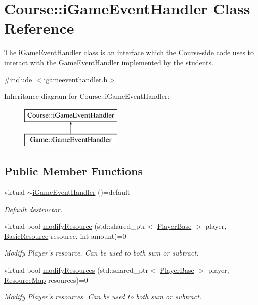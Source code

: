 \hypertarget{classCourse_1_1iGameEventHandler}{\section{Course\-:\-:i\-Game\-Event\-Handler Class Reference}
\label{classCourse_1_1iGameEventHandler}
}


The \hyperlink{classCourse_1_1iGameEventHandler}{i\-Game\-Event\-Handler} class is an interface which the Course-\/side code uses to interact with the Game\-Event\-Handler implemented by the students.  




{\ttfamily \#include $<$igameeventhandler.\-h$>$}

Inheritance diagram for Course\-:\-:i\-Game\-Event\-Handler\-:\begin{figure}[H]
\begin{center}
\leavevmode
\includegraphics[height=2.000000cm]{classCourse_1_1iGameEventHandler}
\end{center}
\end{figure}
\subsection*{Public Member Functions}
\begin{DoxyCompactItemize}
\item 
virtual \hyperlink{classCourse_1_1iGameEventHandler_a355e0d9635cc9b4888a1b77596431faa}{$\sim$i\-Game\-Event\-Handler} ()=default
\begin{DoxyCompactList}\small\item\em Default destructor. \end{DoxyCompactList}\item 
virtual bool \hyperlink{classCourse_1_1iGameEventHandler_abcf1e403dc6081dc348e892fcd197e83}{modify\-Resource} (std\-::shared\-\_\-ptr$<$ \hyperlink{classCourse_1_1PlayerBase}{Player\-Base} $>$ player, \hyperlink{namespaceCourse_a02d49c04029594d4adba79b84bb85f65}{Basic\-Resource} resource, int amount)=0
\begin{DoxyCompactList}\small\item\em Modify Player's resource. Can be used to both sum or subtract. \end{DoxyCompactList}\item 
virtual bool \hyperlink{classCourse_1_1iGameEventHandler_aafe82af26594e1261af045b2a896cd4e}{modify\-Resources} (std\-::shared\-\_\-ptr$<$ \hyperlink{classCourse_1_1PlayerBase}{Player\-Base} $>$ player, \hyperlink{namespaceCourse_ab9a46ed9cd00485e318e5731ea2f78d9}{Resource\-Map} resources)=0
\begin{DoxyCompactList}\small\item\em Modify Player's resources. Can be used to both sum or subtract. \end{DoxyCompactList}\end{DoxyCompactItemize}


